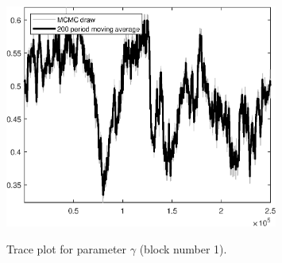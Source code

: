 \begin{figure}[H]
\centering
  \includegraphics[width=0.8\textwidth]{BRS_aggregate/graphs/TracePlot_gam_blck_1}\\
    \caption{Trace plot for parameter $\gamma$ (block number 1).}
\end{figure}

